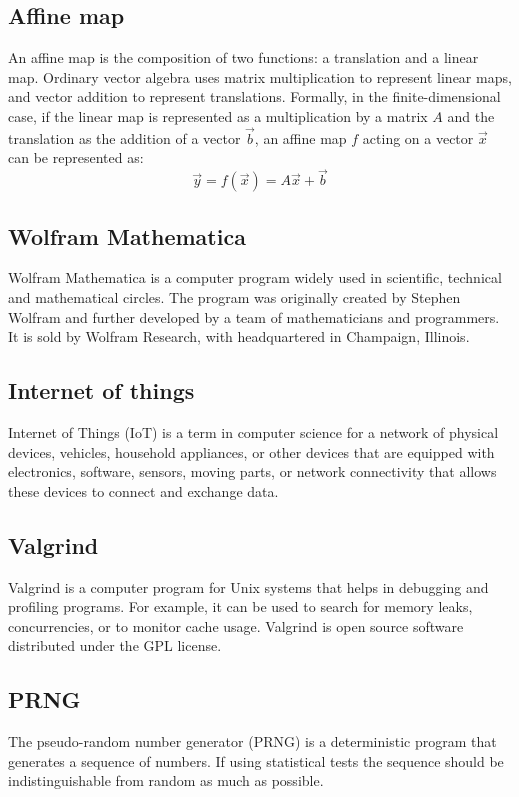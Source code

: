 \documentclass[thesis=M,english]{FITthesis}[2019/12/23]
\begin{document}
\subsection{Affine map}
An affine map is the composition of two functions: a translation and a linear map. Ordinary vector algebra uses matrix multiplication to represent linear maps, and vector addition to represent translations. Formally, in the finite-dimensional case, if the linear map is represented as a multiplication by a matrix $A$ and the translation as the addition of a vector $\vec {b}$, an affine map $f$ acting on a vector ${\vec {x}}$ can be represented as:
\[
{\vec {y}}=f({\vec {x}})=A{\vec {x}}+{\vec {b}}
\]

\subsection{Wolfram Mathematica}
Wolfram Mathematica is a computer program widely used in scientific, technical and mathematical circles. The program was originally created by Stephen Wolfram and further developed by a team of mathematicians and programmers. It is sold by Wolfram Research, with headquartered in Champaign, Illinois.

\subsection{Internet of things}
Internet of Things (IoT) is a term in computer science for a network of physical devices, vehicles, household appliances, or other devices that are equipped with electronics, software, sensors, moving parts, or network connectivity that allows these devices to connect and exchange data.

\subsection{Valgrind}
Valgrind is a computer program for Unix systems that helps in debugging and profiling programs. For example, it can be used to search for memory leaks, concurrencies, or to monitor cache usage. Valgrind is open source software distributed under the GPL license.

\subsection{PRNG}
The pseudo-random number generator (PRNG) is a deterministic program that generates a sequence of numbers. If using statistical tests the sequence should be indistinguishable from random as much as possible.
\end{document}
